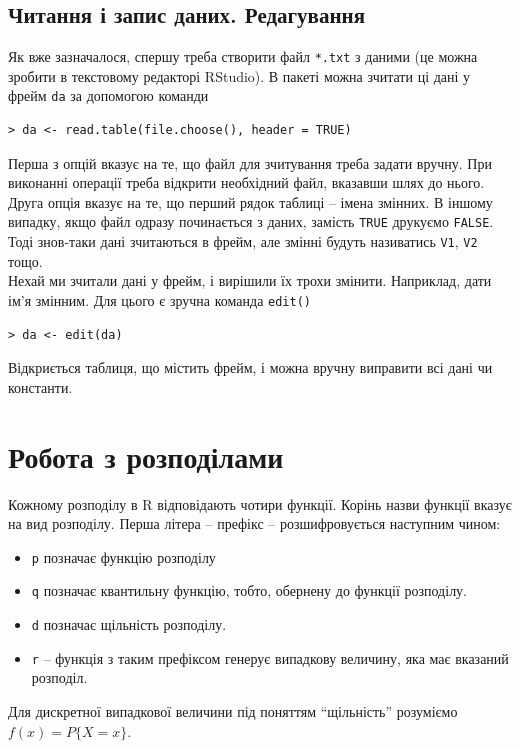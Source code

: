 \documentclass[a4paper, 12pt]{article}
\begin{document}
\subsection{Читання і запис даних. Редагування}

Як вже зазначалося, спершу треба створити файл \verb|*.txt| з даними (це можна зробити в текстовому редакторі RStudio). В пакеті можна зчитати ці дані у фрейм \verb|da| за допомогою команди

\begin{verbatim}
> da <- read.table(file.choose(), header = TRUE)
\end{verbatim}

Перша з опцій вказує на те, що файл для зчитування треба задати вручну. При виконанні операції треба відкрити необхідний файл, вказавши шлях до нього. Друга опція вказує на те, що перший рядок таблиці -- імена змінних. В іншому випадку, якщо файл одразу починається з даних, замість \verb|TRUE| друкуємо \verb|FALSE|. Тоді знов-таки дані зчитаються в фрейм, але змінні будуть називатись \verb|V1|, \verb|V2| тощо. \\

Нехай ми зчитали дані у фрейм, і вирішили їх трохи змінити. Наприклад, дати ім’я змінним. Для цього є зручна команда \verb|edit()|

\begin{verbatim}
> da <- edit(da)
\end{verbatim}

Відкриється таблиця, що містить фрейм, і можна вручну виправити всі дані чи константи.

\section{Робота з розподілами}

Кожному розподілу в R відповідають чотири функції. Корінь назви функції вказує на вид розподілу. Перша літера -- префікс -- розшифровується наступним чином:
\begin{itemize}
	\item \verb|p| позначає функцію розподілу
	\item \verb|q| позначає квантильну функцію, тобто, обернену до функції розподілу.
	\item \verb|d| позначає щільність розподілу.
	\item \verb|r| -- функція з таким префіксом генерує випадкову величину, яка має вказаний розподіл.
\end{itemize}
Для дискретної випадкової величини під поняттям ``щільність'' розуміємо $f(x) = P\{ X = x \}$.
\end{document}
